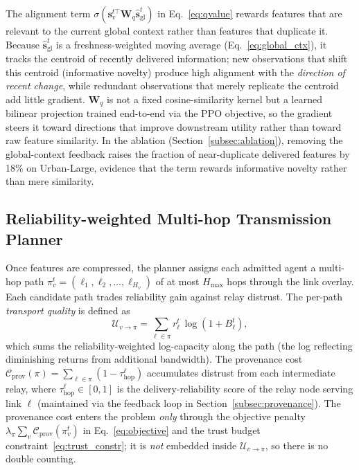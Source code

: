 \documentclass[final,3p,times,review,sort&compress]{elsarticle}
\begin{document}
The alignment term $\sigma(\mathbf{s}_v^{t\top}\mathbf{W}_q\hat{\mathbf{s}}_{\mathrm{gl}}^t)$ in Eq.~\ref{eq:qvalue} rewards features that are relevant to the current global context rather than features that duplicate it. Because $\hat{\mathbf{s}}_{\mathrm{gl}}^t$ is a freshness-weighted moving average (Eq.~\ref{eq:global_ctx}), it tracks the centroid of recently delivered information; new observations that shift this centroid (informative novelty) produce high alignment with the \emph{direction of recent change}, while redundant observations that merely replicate the centroid add little gradient. $\mathbf{W}_q$ is not a fixed cosine-similarity kernel but a learned bilinear projection trained end-to-end via the PPO objective, so the gradient steers it toward directions that improve downstream utility rather than toward raw feature similarity. In the ablation (Section~\ref{subsec:ablation}), removing the global-context feedback raises the fraction of near-duplicate delivered features by 18\% on Urban-Large, evidence that the term rewards informative novelty rather than mere similarity.

\subsection{Reliability-weighted Multi-hop Transmission Planner}
\label{subsec:routing}

Once features are compressed, the planner assigns each admitted agent a multi-hop path $\pi_v^t = (\ell_1,\ell_2,\dots,\ell_{H_v})$ of at most $H_{\max}$ hops through the link overlay. Each candidate path trades reliability gain against relay distrust. The per-path \emph{transport quality} is defined as
\begin{equation}
\mathcal{U}_{v\to\pi} = \sum_{\ell\in\pi} r_\ell^t\,\log(1+B_\ell^t),
\label{eq:path_util}
\end{equation}
which sums the reliability-weighted log-capacity along the path (the log reflecting diminishing returns from additional bandwidth). The provenance cost $\mathcal{C}_{\mathrm{prov}}(\pi) = \sum_{\ell\in\pi}(1-\tau_{\mathrm{hop}}^\ell)$ accumulates distrust from each intermediate relay, where $\tau_{\mathrm{hop}}^\ell\in[0,1]$ is the delivery-reliability score of the relay node serving link $\ell$ (maintained via the feedback loop in Section~\ref{subsec:provenance}). The provenance cost enters the problem \emph{only} through the objective penalty $\lambda_\pi\sum_v\mathcal{C}_{\mathrm{prov}}(\pi_v^t)$ in Eq.~\eqref{eq:objective} and the trust budget constraint~\eqref{eq:trust_constr}; it is \emph{not} embedded inside $\mathcal{U}_{v\to\pi}$, so there is no double counting.
\end{document}
